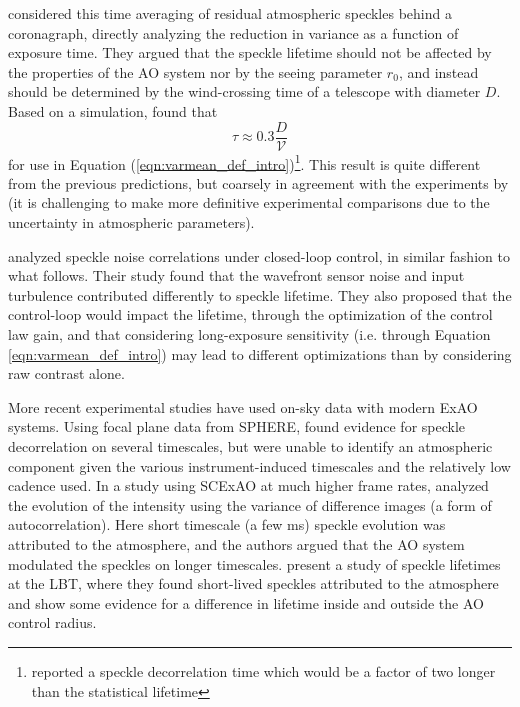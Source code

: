 \documentclass[10pt,preprint]{aastex631}
\begin{document}
\citet{2005SPIE.5903..170M} considered this time averaging of residual atmospheric speckles behind a coronagraph, directly analyzing the reduction in variance as a function of exposure time.  They argued that the speckle lifetime should not be affected by the properties of the AO system nor by the seeing parameter $r_0$, and instead should be determined by the wind-crossing time of a telescope with diameter $D$.  Based on a simulation, \citet{2005SPIE.5903..170M} found that 
\begin{equation}
\tau \approx 0.3 \frac{D}{\mathcal{V}}
\end{equation}
for use in Equation (\ref{eqn:varmean_def_intro})\footnote{\citet{2005SPIE.5903..170M} reported a speckle decorrelation time which would be a factor of two longer than the statistical lifetime}.  This result is quite different from the previous predictions, but coarsely in agreement with the experiments by \citet{2006ApJ...637..541F} (it is challenging to make more definitive experimental comparisons due to the uncertainty in atmospheric parameters).

\citet{2006OExpr..14.7499P} analyzed speckle noise correlations under closed-loop control, in similar fashion to what follows.  Their study found that the wavefront sensor noise and input turbulence contributed differently to speckle lifetime.  They also proposed that the control-loop would impact the lifetime, through the optimization of the control law gain, and that considering long-exposure sensitivity (i.e. through Equation \ref{eqn:varmean_def_intro}) may lead to different optimizations than by considering raw contrast alone. 

More recent experimental studies have used on-sky data with modern ExAO systems.  Using focal plane data from SPHERE, \citet{2016SPIE.9909E..4ZM} found evidence for speckle decorrelation on several timescales, but were unable to identify an atmospheric component given the various instrument-induced timescales and the relatively low cadence used. In a study using SCExAO at much higher frame rates, \citet{2018PASP..130j4502G} analyzed the evolution of the intensity using the variance of difference images (a form of autocorrelation).  Here short timescale (a few ms) speckle evolution was attributed to the atmosphere, and the authors argued that the AO system modulated the speckles on longer timescales.  \citet{2017JATIS...3b5001S} present a study of speckle lifetimes at the LBT, where they found short-lived speckles attributed to the atmosphere and show some evidence for a difference in lifetime inside and outside the AO control radius.
\end{document}
